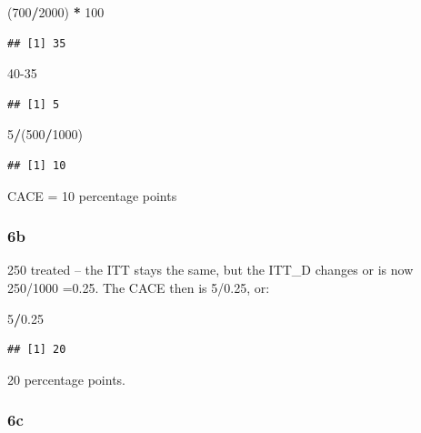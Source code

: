 \documentclass[
]{article}
\newenvironment{Shaded}{\begin{snugshade}}{\end{snugshade}}
\newcommand{\DecValTok}[1]{\textcolor[rgb]{0.00,0.00,0.81}{#1}}
\newcommand{\FloatTok}[1]{\textcolor[rgb]{0.00,0.00,0.81}{#1}}
\newcommand{\NormalTok}[1]{#1}
\newcommand{\SpecialCharTok}[1]{\textcolor[rgb]{0.81,0.36,0.00}{\textbf{#1}}}
\begin{document}
\begin{Shaded}
\begin{Highlighting}[]
\NormalTok{(}\DecValTok{700}\SpecialCharTok{/}\DecValTok{2000}\NormalTok{) }\SpecialCharTok{*} \DecValTok{100}
\end{Highlighting}
\end{Shaded}

\begin{verbatim}
## [1] 35
\end{verbatim}

\begin{Shaded}
\begin{Highlighting}[]
\DecValTok{40{-}35}
\end{Highlighting}
\end{Shaded}

\begin{verbatim}
## [1] 5
\end{verbatim}

\begin{Shaded}
\begin{Highlighting}[]
\DecValTok{5}\SpecialCharTok{/}\NormalTok{(}\DecValTok{500}\SpecialCharTok{/}\DecValTok{1000}\NormalTok{)}
\end{Highlighting}
\end{Shaded}

\begin{verbatim}
## [1] 10
\end{verbatim}

CACE = 10 percentage points

\subsubsection{6b}\label{b-2}

250 treated -- the ITT stays the same, but the ITT\_D changes or is now
250/1000 =0.25. The CACE then is 5/0.25, or:

\begin{Shaded}
\begin{Highlighting}[]
\DecValTok{5}\SpecialCharTok{/}\FloatTok{0.25}
\end{Highlighting}
\end{Shaded}

\begin{verbatim}
## [1] 20
\end{verbatim}

20 percentage points.

\subsubsection{6c}\label{c-2}
\end{document}
